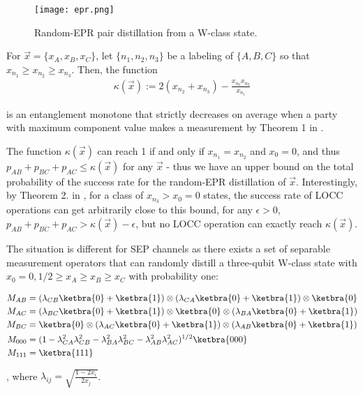 \begin{figure}[!ht]
\center
\texttt{[image: epr.png]}
\caption{Random-EPR pair distillation from a W-class state.}
\label{fig:epr}
\end{figure}

For  $\vec{x}=\{x_A,x_B,x_C\}$, let $\{n_1,n_2,n_3\}$ be a labeling of $\{A,B,C\}$ so that $x_{n_1} \geq x_{n_2} \geq x_{n_3}$. Then, the function 
\begin{align}
\kappa(\vec{x}) := 2(x_{n_2} + x_{n_3}) - \frac{x_{n_2}x_{n_3}}{x_{n_1}} 
\end{align}

is an entanglement monotone that strictly decreases on average when a party with maximum component value makes a measurement by Theorem 1 in \cite{chitambar_increasing_2012}. 

The function $\kappa(\vec{x})$ can reach 1 if and only if $x_{n_1}=x_{n_2}$ and $x_0=0$, and thus $p_{AB}+p_{BC}+p_{AC}\leq \kappa(\vec{x})$ for any $\vec{x}$ - thus we have an upper bound on the total probability of the success rate for the random-EPR distillation of $\vec{x}$. Interestingly, by Theorem 2. in \cite{chitambar_increasing_2012}, for a class of $x_{n_3} > x_0=0$ states, the success rate of LOCC operations can get arbitrarily close to this bound, for any $\epsilon>0$, $p_{AB}+p_{BC}+p_{AC}>\kappa(\vec{x})-\epsilon$, but no LOCC operation can exactly reach $\kappa(\vec{x})$. 

The situation is different for SEP channels as there exists a set of separable measurement operators that can randomly distill a three-qubit W-class state with $x_0=0, 1/2 \geq x_A \geq x_B \geq x_C$ with probability one:

\begin{align}
M_{AB} &= (\lambda_{CB} \ketbra{0} + \ketbra{1}) \otimes (\lambda_{CA} \ketbra{0} + \ketbra{1}) \otimes \ketbra{0} \\
M_{AC} &= (\lambda_{BC} \ketbra{0} + \ketbra{1}) \otimes \ketbra{0} \otimes (\lambda_{BA} \ketbra{0} + \ketbra{1}) \\
M_{BC} &= \ketbra{0} \otimes (\lambda_{AC} \ketbra{0} + \ketbra{1}) \otimes  (\lambda_{AB} \ketbra{0} + \ketbra{1}) \\
M_{000} &= (1-\lambda_{CA}^2\lambda_{CB}^2-\lambda_{BA}^2\lambda_{BC}^2-\lambda_{AB}^2\lambda_{AC}^2)^{1/2}\ketbra{000} \\
M_{111} &= \ketbra{111}
\end{align}

, where $\lambda_{ij}=\sqrt{\frac{1-2x_i}{2x_j}}$.

